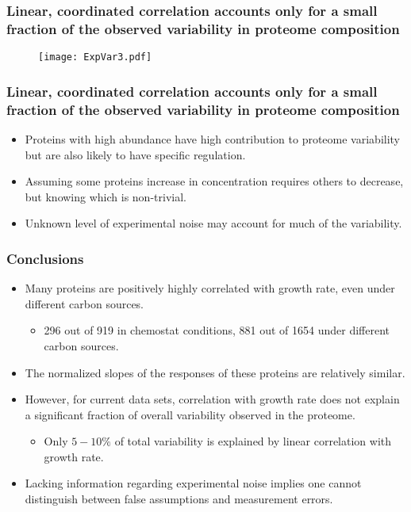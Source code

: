 \documentclass{beamer}
\begin{document}
\begin{frame}
\frametitle{Linear, coordinated correlation accounts only for a small fraction of the observed variability in proteome composition}
\begin{figure}[h!]
\centering
\texttt{[image: ExpVar3.pdf]}
\end{figure}
\end{frame}

\begin{frame}
\frametitle{Linear, coordinated correlation accounts only for a small fraction of the observed variability in proteome composition}
\begin{itemize}
\item Proteins with high abundance have high contribution to proteome variability but are also likely to have specific regulation.
\item Assuming some proteins increase in concentration requires others to decrease, but knowing which is non-trivial.
\item Unknown level of experimental noise may account for much of the variability.
\end{itemize}
\end{frame}

\begin{frame}
\frametitle{Conclusions}
\begin{itemize}
\item Many proteins are positively highly correlated with growth rate, even under different carbon sources.
\begin{itemize}
\item 296 out of 919 in chemostat conditions, 881 out of 1654 under different carbon sources.
\end{itemize}
\item The normalized slopes of the responses of these proteins are relatively similar.
\item However, for current data sets, correlation with growth rate does not explain a significant fraction of overall variability observed in the proteome.
\begin{itemize}
\item Only $5-10\%$ of total variability is explained by linear correlation with growth rate.
\end{itemize}
\item Lacking information regarding experimental noise implies one cannot distinguish between false assumptions and measurement errors.
\end{itemize}
\end{frame}
\end{document}
